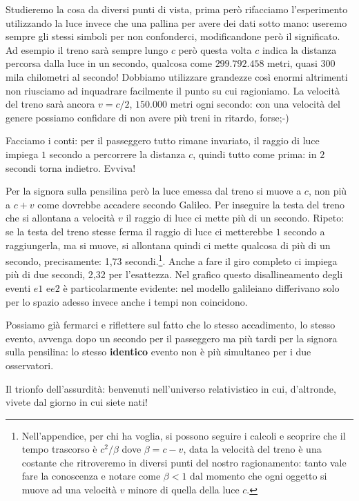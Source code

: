 Studieremo la cosa da diversi punti di vista, prima però rifacciamo l’esperimento utilizzando la luce invece che una pallina per avere dei dati sotto mano: useremo sempre gli stessi simboli per non confonderci, modificandone però il significato. Ad esempio il treno sarà sempre lungo $c$ però questa volta $c$ indica la distanza percorsa dalla luce in un secondo, qualcosa come $299.792.458$ metri, quasi $300$ mila chilometri al secondo! Dobbiamo utilizzare grandezze così enormi altrimenti non riusciamo ad inquadrare facilmente il punto su cui ragioniamo. La velocità del treno sarà ancora $v=c/2$, $150.000$ metri ogni secondo: con una velocità del genere possiamo confidare di non avere più treni in ritardo, forse;-)

Facciamo i conti: per il passeggero tutto rimane invariato, il raggio di luce impiega $1$ secondo a percorrere la distanza $c$, quindi tutto come prima: in $2$ secondi torna indietro. Evviva!

Per la signora sulla pensilina però la luce emessa dal treno si muove a $c$, non più a $c+v$ come dovrebbe accadere secondo Galileo. Per  inseguire la testa del treno che si allontana a velocità $v$ il raggio di luce ci mette più di un secondo. Ripeto: se la testa del treno stesse ferma il raggio di luce ci metterebbe $1$ secondo a raggiungerla, ma si muove, si allontana quindi ci mette qualcosa di più di un secondo, precisamente: 1,73 secondi.\footnote{Nell'appendice, per chi ha voglia, si possono seguire i calcoli e scoprire che il tempo trascorso è $c^2/\beta$ dove $\beta= c-v$, data la velocità del treno è una costante che ritroveremo in diversi punti del nostro ragionamento: tanto vale fare la conoscenza e notare come $\beta<1$ dal momento che ogni oggetto si muove ad una velocità $v$ minore di quella della luce $c$.}. Anche a fare il giro completo ci impiega più di due secondi, 2,32 per l'esattezza. Nel grafico questo disallineamento degli eventi $e1$ e$e2$ è particolarmente evidente: nel modello galileiano differivano solo per lo spazio adesso invece anche i tempi non coincidono.

Possiamo già fermarci e riflettere sul fatto che lo stesso accadimento, lo stesso evento, avvenga dopo un secondo per il passeggero ma più tardi per la signora sulla pensilina: lo stesso \textbf{identico} evento non è più simultaneo per i due osservatori. 

Il trionfo dell'assurdità: benvenuti nell'universo relativistico in cui, d'altronde, vivete dal giorno in cui siete nati!

